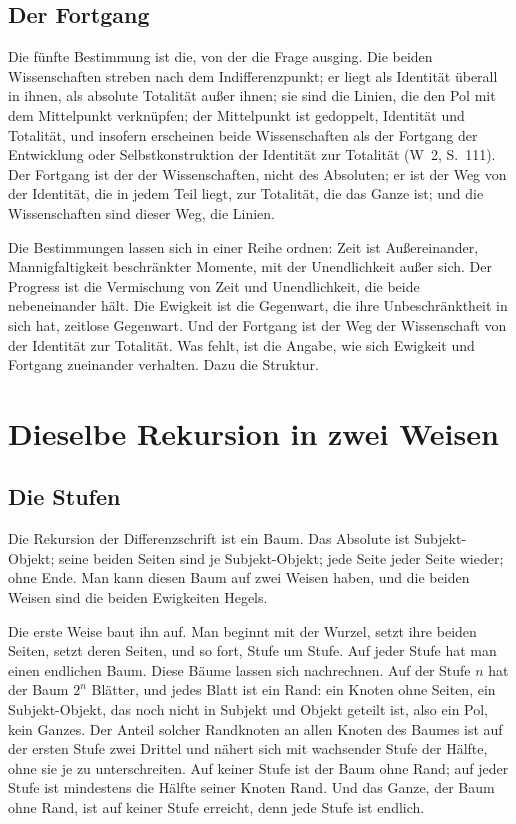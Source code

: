 \documentclass[11pt,a4paper]{article}
\newcommand{\SO}{Subjekt-Objekt}
\newcommand{\Werke}[1]{(W~2, S.~#1)}
\begin{document}
\subsection{Der Fortgang}

Die fünfte Bestimmung ist die, von der die Frage ausging. Die beiden Wissenschaften streben nach dem Indifferenzpunkt; er liegt als Identität überall in ihnen, als absolute Totalität außer ihnen; sie sind die Linien, die den Pol mit dem Mittelpunkt verknüpfen; der Mittelpunkt ist gedoppelt, Identität und Totalität, \glqq und insofern erscheinen beide Wissenschaften als der Fortgang der Entwicklung oder Selbstkonstruktion der Identität zur Totalität\grqq{} \Werke{111}. Der Fortgang ist der der Wissenschaften, nicht des Absoluten; er ist der Weg von der Identität, die in jedem Teil liegt, zur Totalität, die das Ganze ist; und die Wissenschaften sind dieser Weg, die Linien.

Die Bestimmungen lassen sich in einer Reihe ordnen: Zeit ist Außereinander, Mannigfaltigkeit beschränkter Momente, mit der Unendlichkeit außer sich. Der Progress ist die Vermischung von Zeit und Unendlichkeit, die beide nebeneinander hält. Die Ewigkeit ist die Gegenwart, die ihre Unbeschränktheit in sich hat, zeitlose Gegenwart. Und der Fortgang ist der Weg der Wissenschaft von der Identität zur Totalität. Was fehlt, ist die Angabe, wie sich Ewigkeit und Fortgang zueinander verhalten. Dazu die Struktur.

\section{Dieselbe Rekursion in zwei Weisen}

\subsection{Die Stufen}

Die Rekursion der Differenzschrift ist ein Baum. Das Absolute ist \SO{}; seine beiden Seiten sind je \SO{}; jede Seite jeder Seite wieder; ohne Ende. Man kann diesen Baum auf zwei Weisen haben, und die beiden Weisen sind die beiden Ewigkeiten Hegels.

Die erste Weise baut ihn auf. Man beginnt mit der Wurzel, setzt ihre beiden Seiten, setzt deren Seiten, und so fort, Stufe um Stufe. Auf jeder Stufe hat man einen endlichen Baum. Diese Bäume lassen sich nachrechnen. Auf der Stufe $n$ hat der Baum $2^n$ Blätter, und jedes Blatt ist ein Rand: ein Knoten ohne Seiten, ein \SO{}, das noch nicht in Subjekt und Objekt geteilt ist, also ein Pol, kein Ganzes. Der Anteil solcher Randknoten an allen Knoten des Baumes ist auf der ersten Stufe zwei Drittel und nähert sich mit wachsender Stufe der Hälfte, ohne sie je zu unterschreiten. Auf keiner Stufe ist der Baum ohne Rand; auf jeder Stufe ist mindestens die Hälfte seiner Knoten Rand. Und das Ganze, der Baum ohne Rand, ist auf keiner Stufe erreicht, denn jede Stufe ist endlich.
\end{document}
